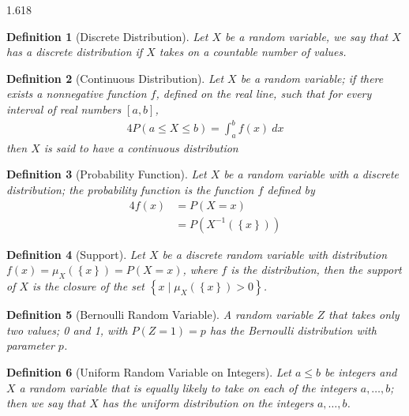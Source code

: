 \documentclass[11pt, oneside]{book}   	%
\newtheorem{definition}{Definition}[chapter]
\newcommand{\set}[1]{\left\{#1\right\}}
\begin{document}
\begin{spacing}{1.618}
		\begin{definition}[Discrete Distribution]
			Let $X$ be a random variable, we say that $X$ has a discrete distribution if $X$ takes on a countable number of values. 
		\end{definition}
		
		\begin{definition}[Continuous Distribution]
			Let $X$ be a random variable; if there exists a nonnegative function $f$, defined on the real line, such that for every interval of real numbers $[a,b]$,
			\begin{alignat}{4}
				P(a\leq X \leq b)=\int_a^b f(x)~dx
			\end{alignat}
			then $X$ is said to have a continuous distribution
		\end{definition}

		\begin{definition}[Probability Function]
			Let $X$ be a random variable with a discrete distribution; the probability function is the function $f$ defined by 
			\begin{alignat}{4}
				f(x)&=P(X=x) \\
					&=P(X^{-1}(\set{x}))
			\end{alignat}
		\end{definition}
		
		\begin{definition}[Support]
			Let $X$ be a discrete random variable with distribution $f(x)=\mu_X(\set{x})=P(X=x)$, where $f$ is the distribution, then the support of $X$ is the closure of the set $\set{x\mid \mu_X(\set{x})>0}$. 
		\end{definition}

		\begin{definition}[Bernoulli Random Variable]
			A random variable $Z$ that takes only two values; 0 and 1, with $P(Z=1)=p$ has the \emph{Bernoulli distribution} with parameter $p$. 
		\end{definition}
		
		\begin{definition}[Uniform Random Variable on Integers]
			Let $a\leq b$ be integers and $X$ a random variable that is equally likely to take on each of the integers $a, \dots, b$; then we say that $X$ has the \emph{uniform distribution on the integers} $a, \dots, b$. 
		\end{definition}
		

\end{spacing}
\end{document}
